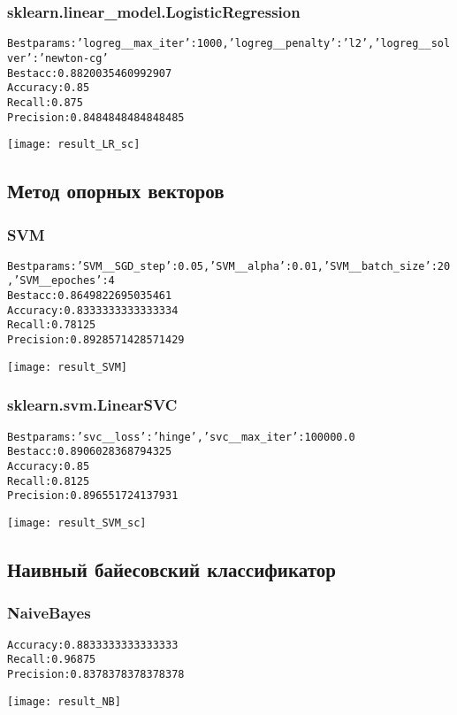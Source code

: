 \subsubsection{sklearn.linear\_model.LogisticRegression}
\begin{alltt}
Best params: {'logreg__max_iter': 1000, 'logreg__penalty': 'l2', 'logreg__solver': 'newton-cg'}
Best acc: 0.8820035460992907
Accuracy: 0.85
Recall: 0.875
Precision: 0.8484848484848485
\end{alltt}
\begin{center}
\texttt{[image: result\_LR\_sc]}
\end{center}
\pagebreak

\subsection{Метод опорных векторов}
\subsubsection{SVM}
\begin{alltt}
Best params: {'SVM__SGD_step': 0.05, 'SVM__alpha': 0.01, 'SVM__batch_size': 20, 'SVM__epoches': 4}
Best acc: 0.8649822695035461
Accuracy: 0.8333333333333334
Recall: 0.78125
Precision: 0.8928571428571429
\end{alltt}
\begin{center}
\texttt{[image: result\_SVM]}
\end{center}

\subsubsection{sklearn.svm.LinearSVC}
\begin{alltt}
Best params: {'svc__loss': 'hinge', 'svc__max_iter': 100000.0}
Best acc: 0.8906028368794325
Accuracy: 0.85
Recall: 0.8125
Precision: 0.896551724137931
\end{alltt}
\begin{center}
\texttt{[image: result\_SVM\_sc]}
\end{center}
\pagebreak

\subsection{Наивный байесовский классификатор}
\subsubsection{NaiveBayes}
\begin{alltt}
Accuracy: 0.8833333333333333
Recall: 0.96875
Precision: 0.8378378378378378
\end{alltt}
\begin{center}
\texttt{[image: result\_NB]}
\end{center}


